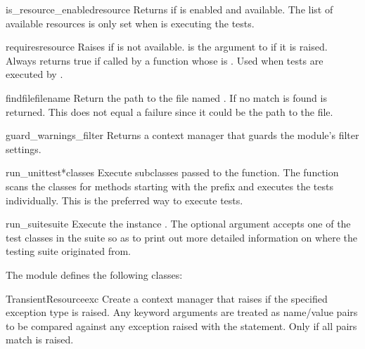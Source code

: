 \begin{funcdesc}{is_resource_enabled}{resource}
Returns  if  is enabled and available.
The list of available resources is only set when 
is executing the tests.
\end{funcdesc}

\begin{funcdesc}{requires}{resource}
Raises  if  is not available.
 is the argument to  if it is raised.
Always returns true if called by a function whose  is
.
Used when tests are executed by .
\end{funcdesc}

\begin{funcdesc}{findfile}{filename}
Return the path to the file named .
If no match is found  is returned.
This does not equal a failure since it could be the path to the file.
\end{funcdesc}

\begin{funcdesc}{guard_warnings_filter}{}
Returns a context manager that guards the  module's
filter settings.
\end{funcdesc}

\begin{funcdesc}{run_unittest}{*classes}
Execute  subclasses passed to the function.
The function scans the classes for methods starting with the prefix
 and executes the tests individually.
This is the preferred way to execute tests.
\end{funcdesc}

\begin{funcdesc}{run_suite}{suite}
Execute the  instance .
The optional argument  accepts one of the test classes in the
suite so as to print out more detailed information on where the testing suite
originated from.
\end{funcdesc}

The  module defines the following classes:

\begin{classdesc}{TransientResource}{exc}
Create a context manager that raises  if the specified
exception type is raised.  Any keyword arguments are treated as name/value
pairs to be compared against any exception raised with the 
statement.  Only if all pairs match is  raised.
\end{classdesc}

